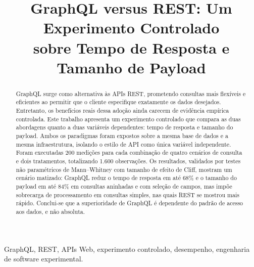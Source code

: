 \documentclass[conference]{IEEEtran}
\begin{document}
\title{GraphQL versus REST: Um Experimento Controlado\\
sobre Tempo de Resposta e Tamanho de Payload}

\author{
\and
{}
\and
{}
}

\maketitle

\begin{abstract}
GraphQL surge como alternativa às APIs REST, prometendo consultas mais
flexíveis e eficientes ao permitir que o cliente especifique exatamente os
dados desejados. Entretanto, os benefícios reais dessa adoção ainda carecem de
evidência empírica controlada. Este trabalho apresenta um experimento
controlado que compara as duas abordagens quanto a duas variáveis dependentes:
tempo de resposta e tamanho do payload. Ambos os paradigmas foram expostos
sobre a mesma base de dados e a mesma infraestrutura, isolando o estilo de API
como única variável independente. Foram executadas 200 medições para cada
combinação de quatro cenários de consulta e dois tratamentos, totalizando 1.600
observações. Os resultados, validados por testes não paramétricos de
Mann--Whitney com tamanho de efeito de Cliff, mostram um cenário matizado:
GraphQL reduz o tempo de resposta em até 68\% e o tamanho do payload em até 84\%
em consultas aninhadas e com seleção de campos, mas impõe sobrecarga de
processamento em consultas simples, nas quais REST se mostrou mais rápido.
Conclui-se que a superioridade de GraphQL é dependente do padrão de acesso aos
dados, e não absoluta.
\end{abstract}

\begin{IEEEkeywords}
GraphQL, REST, APIs Web, experimento controlado, desempenho, engenharia de
software experimental.
\end{IEEEkeywords}
\end{document}
